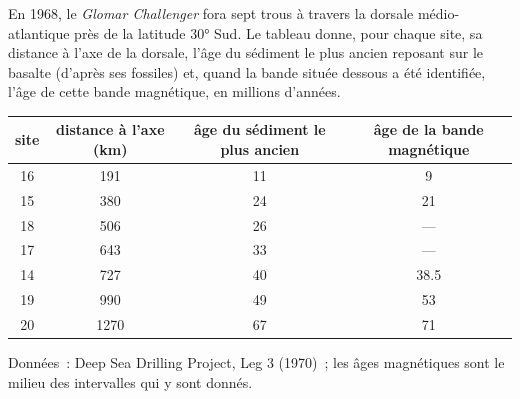 \begin{problem}
\label{pb:g11:drift-to-spreading:1}
En 1968, le \emph{Glomar Challenger} fora sept trous à travers la dorsale
médio-atlantique près de la latitude \ang{30} Sud. Le tableau donne, pour
chaque site, sa distance à l'axe de la dorsale, l'âge du sédiment le plus
ancien reposant sur le basalte (d'après ses fossiles) et, quand la bande
située dessous a été identifiée, l'âge de cette bande magnétique, en
millions d'années.

\begin{center}
\small
\begin{tabular}{|c|c|c|c|}
\hline
site & distance à l'axe (\unit{km}) & âge du sédiment le plus ancien & âge de la bande magnétique \\ \hline
16 & 191 & 11 & 9 \\ \hline
15 & 380 & 24 & 21 \\ \hline
18 & 506 & 26 & --- \\ \hline
17 & 643 & 33 & --- \\ \hline
14 & 727 & 40 & 38.5 \\ \hline
19 & 990 & 49 & 53 \\ \hline
20 & 1270 & 67 & 71 \\ \hline
\end{tabular}

{\small Données~: Deep Sea Drilling Project, Leg 3 (1970)~; les âges
magnétiques sont le milieu des intervalles qui y sont donnés.}
\end{center}

\begin{center}


\end{center}
\end{problem}

